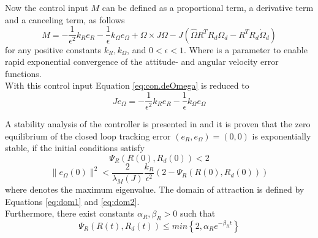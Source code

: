 
Now the control input $ M $ can be defined as a proportional term, a derivative term and a canceling term, as follows \cite{Sreenath2013c}
\begin{equation}\label{eq:con.M}
M = -\frac{1}{\epsilon^2}k_Re_R-\frac{1}{\epsilon}k_\Omega e_\Omega+\Omega\times J\Omega-J(\hat{\Omega}R^TR_d\Omega_d-R^TR_d\dot{\Omega}_d)
\end{equation}
for any positive constants $ k_R, k_\Omega $, and $ 0<\epsilon<1 $. Where  is a parameter to enable rapid exponential convergence of the attitude- and angular velocity error functions.\\
With this control input Equation \ref{eq:con.deOmega} is reduced to
\begin{equation}\label{key}
J\dot{e}_\Omega=-\frac{1}{\epsilon^2}k_Re_R-\frac{1}{\epsilon}k_\Omega e_\Omega
\end{equation} 

A stability analysis of the controller is presented in \cite{Lee2010} and it is proven that the zero equilibrium of the closed loop tracking error $ (e_R,e_\Omega)=(0,0) $ is exponentially stable, if the initial conditions satisfy
\begin{equation}\label{eq:dom1}
\Psi_R(R(0),R_d(0))<2
\end{equation}
\begin{equation}\label{eq:dom2}
\parallel e_\Omega(0)\parallel^2<\frac{2}{\lambda_M(J)}\frac{k_R}{\epsilon^2}(2-\Psi_R(R(0),R_d(0)))
\end{equation}
where  denotes the maximum eigenvalue. The domain of attraction is defined by Equations \ref{eq:dom1} and \ref{eq:dom2}. \\
Furthermore, there exist constants $ \alpha_R,\beta_R>0 $ such that
\begin{equation}\label{eq:con.PsiRconv}
\Psi_R(R(t),R_d(t)) \leq min\left\lbrace 2,\alpha_Re^{-\beta_Rt}\right\rbrace 
\end{equation}


